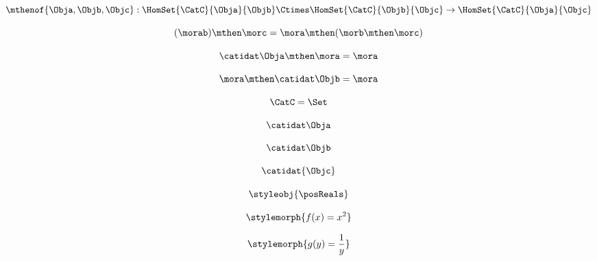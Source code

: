 \begin{forslides}
        \begin{equation}
            \label{eq:semicats-slides-19}
            \mthenof{\Obja,\Objb,\Objc}: \HomSet{\CatC}{\Obja}{\Objb} \Ctimes \HomSet{\CatC}{\Objb}{\Objc}\to \HomSet{\CatC}{\Obja}{\Objc}
        \end{equation}

        \begin{equation}
            \label{eq:semicats-slides-20}
            (\morab)
            \mthen \morc= \mora \mthen (\morb \mthen \morc)
        \end{equation}

        \begin{equation}
            \label{eq:semicats-slides-21}
            \catidat\Obja \mthen \mora = \mora
        \end{equation}

        \begin{equation}
            \label{eq:semicats-slides-22}
            \mora \mthen \catidat\Objb = \mora
        \end{equation}

        \begin{equation}
            \label{eq:semicats-slides-23}
            \CatC = \Set
        \end{equation}

        \begin{equation}
            \label{eq:semicats-slides-24}
            \catidat\Obja
        \end{equation}

        \begin{equation}
            \label{eq:semicats-slides-25}
            \catidat\Objb
        \end{equation}

        \begin{equation}
            \label{eq:semicats-slides-26}
            \catidat{\Objc}
        \end{equation}

        \begin{equation}
            \label{eq:semicats-slides-27}
            \styleobj{\posReals}
        \end{equation}

        \begin{equation}
            \label{eq:semicats-slides-28}
            \stylemorph{f(x) = x^2}
        \end{equation}

        \begin{equation}
            \label{eq:semicats-slides-29}
            \stylemorph{g(y) = \frac{1}{y}}
        \end{equation}


\end{forslides}
